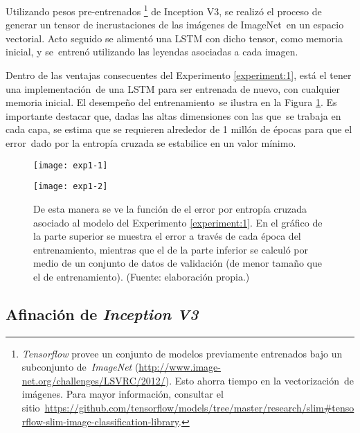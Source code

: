 \begin{experiment} \label{experiment:1}
  Utilizando pesos pre-entrenados%
  \footnote{
    \emph{Tensorflow} provee un conjunto de modelos previamente entrenados bajo un subconjunto de\
    \emph{ImageNet} (\url{http://www.image-net.org/challenges/LSVRC/2012/}). Esto ahorra tiempo en la vectorización\
    de imágenes. Para mayor información, consultar el sitio\
    \url{https://github.com/tensorflow/models/tree/master/research/slim\#tensorflow-slim-image-classification-library}.
  } de Inception V3, se realizó el proceso de generar un tensor de incrustaciones de las imágenes de ImageNet\
  en un espacio vectorial. Acto seguido se alimentó una LSTM con dicho tensor, como memoria inicial, y se\
  entrenó utilizando las leyendas asociadas a cada imagen.
\end{experiment}

Dentro de las ventajas consecuentes del Experimento \ref{experiment:1}, está el tener una implementación\
de una LSTM para ser entrenada de nuevo, con cualquier memoria inicial. El desempeño del entrenamiento\
se ilustra en la Figura \ref{exp1}. Es importante destacar que, dadas las altas dimensiones con las que\
se trabaja en cada capa, se estima que se requieren alrededor de 1 millón de épocas para que el error\
dado por la entropía cruzada se estabilice en un valor mínimo.

\begin{figure}[H]
  \centering
  \begin{minipage}[c]{\linewidth}
    \texttt{[image: exp1-1]}
  \end{minipage}\hfill
  \begin{minipage}[c]{\linewidth}
    \texttt{[image: exp1-2]}
  \end{minipage}
  \caption{
    De esta manera se ve la función de el error por entropía cruzada asociado al modelo del
    Experimento \ref{experiment:1}. En el gráfico de la parte superior se muestra el error
    a través de cada época del entrenamiento, mientras que el de la parte inferior se
    calculó por medio de un conjunto de datos de validación (de menor tamaño que el de entrenamiento).
    (Fuente: elaboración propia.)
  }
  \label{exp1}
\end{figure}


\subsection{Afinación de \emph{Inception V3}}

